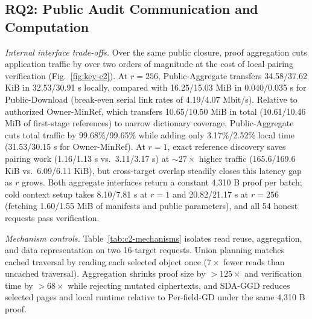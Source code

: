 \documentclass[10pt,journal]{IEEEtran}
\begin{document}
\subsection{RQ2: Public Audit Communication and Computation}
\emph{Internal interface trade-offs.}
Over the same public closure, proof aggregation cuts application traffic by over two orders of magnitude at the cost of local pairing verification (Fig.~\ref{fig:key-c2}). At $r{=}256$, Public-Aggregate transfers 34.58/37.62 KiB in 32.53/30.91 s locally, compared with 16.25/15.03 MiB in 0.040/0.035 s for Public-Download (break-even serial link rates of 4.19/4.07 Mbit/s). Relative to authorized Owner-MinRef, which transfers 10.65/10.50 MiB in total (10.61/10.46 MiB of first-stage references) to narrow dictionary coverage, Public-Aggregate cuts total traffic by 99.68\%/99.65\% while adding only 3.17\%/2.52\% local time (31.53/30.15 s for Owner-MinRef). At $r{=}1$, exact reference discovery saves pairing work (1.16/1.13 s vs.\ 3.11/3.17 s) at $\sim 27\times$ higher traffic (165.6/169.6 KiB vs.\ 6.09/6.11 KiB), but cross-target overlap steadily closes this latency gap as $r$ grows. Both aggregate interfaces return a constant 4,310 B proof per batch; cold context setup takes 8.10/7.81 s at $r{=}1$ and 20.82/21.17 s at $r{=}256$ (fetching 1.60/1.55 MiB of manifests and public parameters), and all 54 honest requests pass verification.

\emph{Mechanism controls.}
Table~\ref{tab:c2-mechanisms} isolates read reuse, aggregation, and data representation on two 16-target requests. Union planning matches cached traversal by reading each selected object once ($7\times$ fewer reads than uncached traversal). Aggregation shrinks proof size by $>125\times$ and verification time by $>68\times$ while rejecting mutated ciphertexts, and SDA-GGD reduces selected pages and local runtime relative to Per-field-GD under the same 4,310 B proof.
\end{document}

